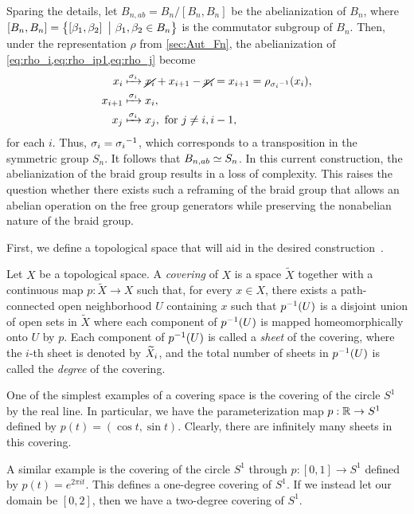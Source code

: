 Sparing the details, let $B_{n,ab} = B_n/\left[ B_n,B_n \right]$ be the abelianization of $B_n$, where $\left[ B_n,B_n \right]=\left\{ \left[ \beta_1,\beta_2 \right]~\big|~\beta_1,\beta_2\in B_n \right\}$ is the commutator subgroup of $B_n$. Then, under the representation $\rho$ from \cref{sec:Aut_Fn}, the abelianization of \cref{eq:rho_i,eq:rho_ip1,eq:rho_j} become
\begin{align}
    x_i &\xmapsto{\sigma_i} \cancel{x_i} + x_{i+1} - \cancel{x_i} = x_{i+1} = \rho_{{ \sigma_i }^{-1}}(x_i), \\
    x_{i+1} &\xmapsto{\sigma_i} x_i, \\
    x_j &\xmapsto{\sigma_i} x_j, \textrm{ for } j\neq i,i-1,
\end{align}
for each $i$. Thus, $\sigma_i={ \sigma_i }^{-1}$, which corresponds to a transposition in the symmetric group $S_n$. It follows that $B_{n,ab}\simeq S_n$. In this current construction, the abelianization of the braid group results in a loss of complexity. This raises the question whether there exists such a reframing of the braid group that allows an abelian operation on the free group generators while preserving the nonabelian nature of the braid group.

First, we define a topological space that will aid in the desired construction~\cite{Thiffeault2022,Fulton1997,Burau1935}.
\begin{definition}
    Let $X$ be a topological space. A \textit{covering} of $X$ is a space $\widetilde{X}$ together with a continuous map $p:\widetilde{X}\to X$ such that, for every $x\in X$, there exists a path-connected open neighborhood $U$ containing $x$ such that ${ p }^{-1}(U)$ is a disjoint union of open sets in $\widetilde{X}$ where each component of ${ p }^{-1}(U)$ is mapped homeomorphically onto $U$ by $p$. Each component of ${ p }^{-1}(U)$ is called a \textit{sheet} of the covering, where the $i$-th sheet is denoted by $\widetilde{X}_{i}$, and the total number of sheets in ${ p }^{-1}(U)$ is called the \textit{degree} of the covering.
\end{definition}

\begin{example}
    One of the simplest examples of a covering space is the covering of the circle $S^1$ by the real line. In particular, we have the parameterization map $p:\mathbb{R}\to S^1$ defined by $p(t)=\left( \cos t,\sin t \right)$. Clearly, there are infinitely many sheets in this covering.
\end{example}

\begin{example}
    A similar example is the covering of the circle $S^1$ through $p:\left[ 0,1 \right]\to S^1$ defined by $p(t) = e^{2\pi it}$. This defines a one-degree covering of $S^1$. If we instead let our domain be $\left[ 0,2 \right]$, then we have a two-degree covering of $S^1$.
\end{example}

